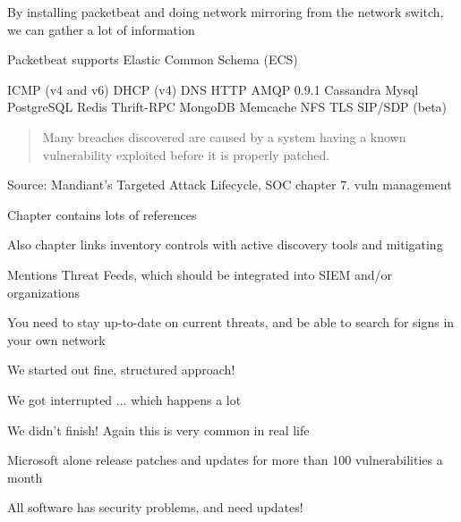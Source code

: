\documentclass[Screen16to9,17pt]{foils}
\begin{document}



\begin{list2}
\item By installing packetbeat and doing network mirroring from the network switch, we can gather a lot of information
\item Packetbeat supports Elastic Common Schema (ECS) 
\item ICMP (v4 and v6)
DHCP (v4)
DNS
HTTP
AMQP 0.9.1
Cassandra
Mysql
PostgreSQL
Redis
Thrift-RPC
MongoDB
Memcache
NFS
TLS
SIP/SDP (beta)
\end{list2}






\begin{quote}
Many breaches discovered are caused by a system having a known vulnerability exploited before it is properly patched.
\end{quote}

Source: Mandiant’s Targeted Attack Lifecycle, SOC chapter 7. vuln management

\begin{list2}
\item Chapter contains lots of references
\item Also chapter links inventory controls with active discovery tools and mitigating
\item Mentions Threat Feeds, which should be integrated into SIEM and/or organizations
\item You need to stay up-to-date on current threats, and be able to search for signs in your own network
\end{list2}








\begin{list2}
\item We started out fine, structured approach!
\item We got interrupted ... which happens a lot
\item We didn't finish! Again this is very common in real life
\item Microsoft alone release patches and updates for more than 100 vulnerabilities a month
\item All software has security problems, and need updates!
\end{list2}
\end{document}
